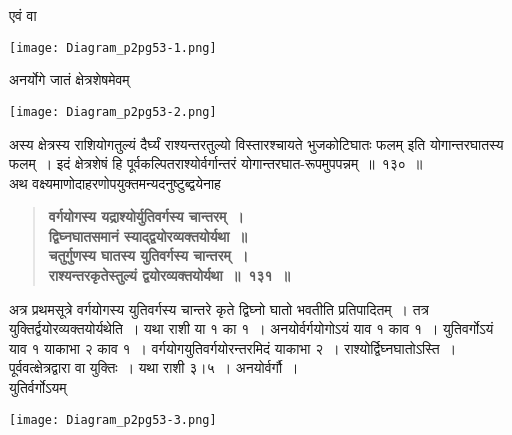 \documentclass[11pt, openany]{book}
\begin{document}
\begin{sloppypar}
एवं वा

\begin{center}
    \texttt{[image: Diagram\_p2pg53-1.png]}
\end{center}

अनर्योगे जातं क्षेत्रशेषमेवम्

\begin{center}
    \texttt{[image: Diagram\_p2pg53-2.png]}
\end{center}

अस्य क्षेत्रस्य राशियोगतुल्यं दैर्घ्यं राश्यन्तरतुल्यो विस्तारश्चायते भुजकोटिघातः फलम् इति योगान्तरघातस्य फलम्~। इदं क्षेत्रशेषं हि पूर्वकल्पितराश्योर्वर्गान्तरं योगान्तरघात-रूपमुपपन्नम्~॥~१३०~॥\\

{\small अथ वक्ष्यमाणोदाहरणोपयुक्तमन्यदनुष्टुब्द्वयेनाह\textendash }

 \label{8.131}
\begin{quote}
{\large \textbf{{\color{purple}वर्गयोगस्य यद्राश्योर्युतिवर्गस्य चान्तरम्~।\\
द्विघ्नघातसमानं स्याद्द्वयोरव्यक्तयोर्यथा~॥\\
चतुर्गुणस्य घातस्य युतिवर्गस्य चान्तरम्~।\\
राश्यन्तरकृतेस्तुल्यं द्वयोरव्यक्तयोर्यथा~॥~१३१~॥}}}
\end{quote}

अत्र प्रथमसूत्रे वर्गयोगस्य युतिवर्गस्य चान्तरे कृते द्विघ्नो घातो भवतीति प्रतिपादितम्~। तत्र युक्तिर्द्वयोरव्यक्तयोर्यथेति~। यथा राशी या १ का १~। अनयोर्वर्गयोगोऽयं याव १ काव १~। युतिवर्गोऽयं याव १ याकाभा २ काव १~। वर्गयोगयुतिवर्गयोरन्तरमिदं याकाभा २~। राश्योर्द्विघ्नघातोऽस्ति~। पूर्ववत्क्षेत्रद्वारा वा युक्तिः~। यथा राशी ३।५~। अनयोर्वर्गौ~। \\

युतिर्वर्गोऽयम्
\vspace{-1mm}

\begin{center}
    \texttt{[image: Diagram\_p2pg53-3.png]}
\end{center}
\end{sloppypar}

\newpage
\end{document}
